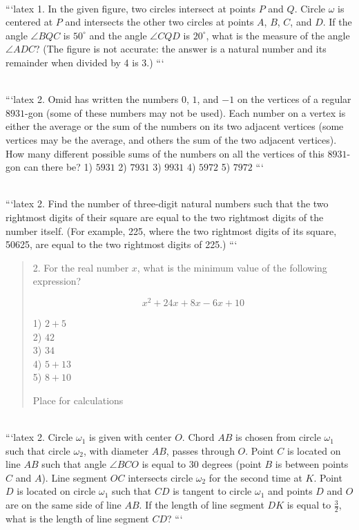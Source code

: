 \\
```latex
1. In the given figure, two circles intersect at points $P$ and $Q$. Circle $\omega$ is centered at $P$ and intersects the other two circles at points $A$, $B$, $C$, and $D$. If the angle $\angle BQC$ is $50^\circ$ and the angle $\angle CQD$ is $20^\circ$, what is the measure of the angle $\angle ADC$? (The figure is not accurate: the answer is a natural number and its remainder when divided by 4 is 3.)
```

\\
```latex
2. Omid has written the numbers $0$, $1$, and $-1$ on the vertices of a regular $8931$-gon (some of these numbers may not be used). Each number on a vertex is either the average or the sum of the numbers on its two adjacent vertices (some vertices may be the average, and others the sum of the two adjacent vertices). How many different possible sums of the numbers on all the vertices of this $8931$-gon can there be? 
1) $5931$  2) $7931$  3) $9931$  4) $5972$  5) $7972$
```

\\
```latex
2. Find the number of three-digit natural numbers such that the two rightmost digits of their square are equal to the two rightmost digits of the number itself. (For example, 225, where the two rightmost digits of its square, 50625, are equal to the two rightmost digits of 225.)
```
\\
\begin{quote}
2. For the real number $x$, what is the minimum value of the following expression?

\[ x^2 + 24x + 8x - 6x + 10 \]

1) $2 + 5$ \\
2) $42$ \\
3) $34$ \\
4) $5 + 13$ \\
5) $8 + 10$

Place for calculations
\end{quote}
\\
```latex
2. Circle $\omega_1$ is given with center $O$. Chord $AB$ is chosen from circle $\omega_1$ such that circle $\omega_2$, with diameter $AB$, passes through $O$. Point $C$ is located on line $AB$ such that angle $\angle BCO$ is equal to $30$ degrees (point $B$ is between points $C$ and $A$). Line segment $OC$ intersects circle $\omega_2$ for the second time at $K$. Point $D$ is located on circle $\omega_1$ such that $CD$ is tangent to circle $\omega_1$ and points $D$ and $O$ are on the same side of line $AB$. If the length of line segment $DK$ is equal to $\frac{3}{2}$, what is the length of line segment $CD$?
```

